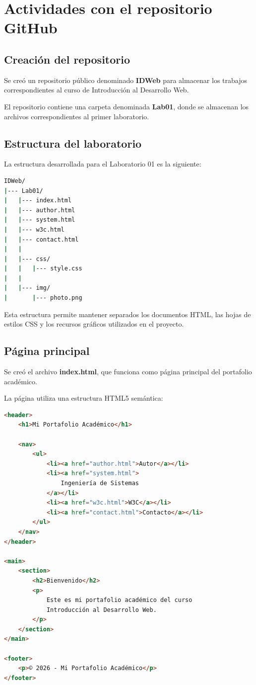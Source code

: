 \documentclass{article}
\begin{document}
\section{Actividades con el repositorio GitHub}

\subsection{Creación del repositorio}

Se creó un repositorio público denominado
\textbf{IDWeb} para almacenar los trabajos correspondientes
al curso de Introducción al Desarrollo Web.

El repositorio contiene una carpeta denominada
\textbf{Lab01}, donde se almacenan los archivos correspondientes
al primer laboratorio.

\subsection{Estructura del laboratorio}

La estructura desarrollada para el Laboratorio 01 es la siguiente:

\begin{lstlisting}[language=bash]
IDWeb/
|--- Lab01/
|   |--- index.html
|   |--- author.html
|   |--- system.html
|   |--- w3c.html
|   |--- contact.html
|   |
|   |--- css/
|   |   |--- style.css
|   |
|   |--- img/
|       |--- photo.png
\end{lstlisting}

Esta estructura permite mantener separados los documentos HTML,
las hojas de estilos CSS y los recursos gráficos utilizados
en el proyecto.

\subsection{Página principal}

Se creó el archivo \textbf{index.html}, que funciona como página
principal del portafolio académico.

La página utiliza una estructura HTML5 semántica:

\begin{lstlisting}[language=HTML]
<header>
    <h1>Mi Portafolio Académico</h1>

    <nav>
        <ul>
            <li><a href="author.html">Autor</a></li>
            <li><a href="system.html">
                Ingeniería de Sistemas
            </a></li>
            <li><a href="w3c.html">W3C</a></li>
            <li><a href="contact.html">Contacto</a></li>
        </ul>
    </nav>
</header>

<main>
    <section>
        <h2>Bienvenido</h2>
        <p>
            Este es mi portafolio académico del curso
            Introducción al Desarrollo Web.
        </p>
    </section>
</main>

<footer>
    <p>© 2026 - Mi Portafolio Académico</p>
</footer>
\end{lstlisting}
\end{document}
